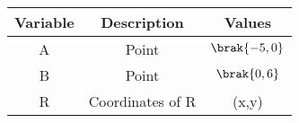 \begin{tabular}[12pt]{ |c|c|c|}
    \hline
    \textbf{Variable} & \textbf{Description} & \textbf{Values}\\ 
    \hline
    A & Point & $\brak{-5,0}$\\
    \hline
    B & Point & $\brak{0,6}$ \\
    \hline
    R &  Coordinates of R & (x,y) \\

    \hline   
    \end{tabular}
